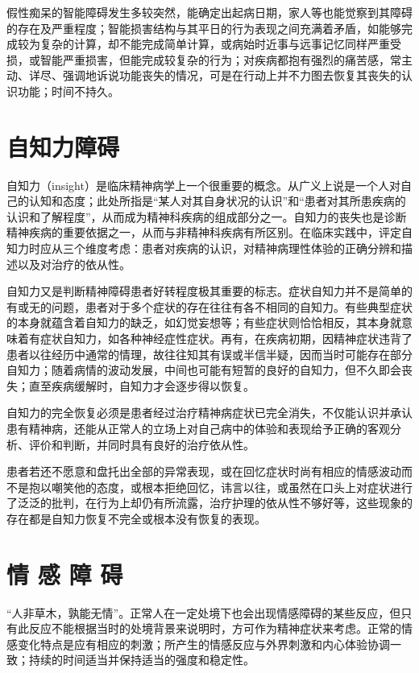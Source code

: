 假性痴呆的智能障碍发生多较突然，能确定出起病日期，家人等也能觉察到其障碍的存在及严重程度；智能损害结构与其平日的行为表现之间充满着矛盾，如能够完成较为复杂的计算，却不能完成简单计算，或病始时近事与远事记忆同样严重受损，或智能严重损害，但能完成较复杂的行为；对疾病都抱有强烈的痛苦感，常主动、详尽、强调地诉说功能丧失的情况，可是在行动上并不力图去恢复其丧失的认识功能；时间不持久。

\section{自知力障碍}

自知力（insight）是临床精神病学上一个很重要的概念。从广义上说是一个人对自己的认知和态度；此处所指是``某人对其自身状况的认识''和``患者对其所患疾病的认识和了解程度''，从而成为精神科疾病的组成部分之一。自知力的丧失也是诊断精神疾病的重要依据之一，从而与非精神科疾病有所区别。在临床实践中，评定自知力时应从三个维度考虑：患者对疾病的认识，对精神病理性体验的正确分辨和描述以及对治疗的依从性。

自知力又是判断精神障碍患者好转程度极其重要的标志。症状自知力并不是简单的有或无的问题，患者对于多个症状的存在往往有各不相同的自知力。有些典型症状的本身就蕴含着自知力的缺乏，如幻觉妄想等；有些症状则恰恰相反，其本身就意味着有症状自知力，如各种神经症性症状。再有，在疾病初期，因精神症状违背了患者以往经历中通常的情理，故往往知其有误或半信半疑，因而当时可能存在部分自知力；随着病情的波动发展，中间也可能有短暂的良好的自知力，但不久即会丧失；直至疾病缓解时，自知力才会逐步得以恢复。

自知力的完全恢复必须是患者经过治疗精神病症状已完全消失，不仅能认识并承认患有精神病，还能从正常人的立场上对自己病中的体验和表现给予正确的客观分析、评价和判断，并同时具有良好的治疗依从性。

患者若还不愿意和盘托出全部的异常表现，或在回忆症状时尚有相应的情感波动而不是抱以嘲笑他的态度，或根本拒绝回忆，讳言以往，或虽然在口头上对症状进行了泛泛的批判，在行为上却仍有所流露，治疗护理的依从性不够好等，这些现象的存在都是自知力恢复不完全或根本没有恢复的表现。

\section{情 感 障 碍}

``人非草木，孰能无情''。正常人在一定处境下也会出现情感障碍的某些反应，但只有此反应不能根据当时的处境背景来说明时，方可作为精神症状来考虑。正常的情感变化特点是应有相应的刺激；所产生的情感反应与外界刺激和内心体验协调一致；持续的时间适当并保持适当的强度和稳定性。

